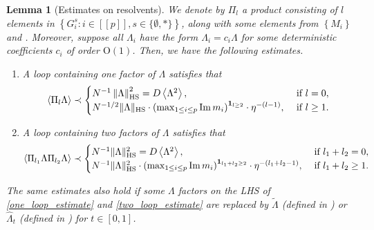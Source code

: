 \documentclass[10pt,reqno]{amsart}
\numberwithin{equation}{section}
\numberwithin{figure}{section}
\theoremstyle{plain} %
\newtheorem{lemma}[theorem]{Lemma}
\theoremstyle{definition} %
\newcommand{\wh}{\widehat}
\newcommand{\wt}{\widetilde}
\renewcommand{\txt}[1]{\text{\rm{#1}}}
\renewcommand{\leq}{\le}
\renewcommand{\geq}{\ge}
\newcommand{\qq}[1]{[\![{#1}]\!]}
\newcommand{\pa}[1]{\left({#1}\right)}
\newcommand{\qa}[1]{\left[{#1}\right]}
\newcommand{\ha}[1]{\left\{{#1}\right\}}
\newcommand{\norm}[1]{\lVert #1 \rVert}
\newcommand{\norma}[1]{\left\lVert #1 \right\rVert}
\newcommand{\avga}[1]{\left\langle #1 \right\rangle}
\DeclareMathOperator{\im}{\mathrm{Im}}
\newcommand{\tLambda}{{\wt{\Lambda}}}
\newcommand{\hLambda}{{\wh{\Lambda}}}
\newcommand{\OO}{\mathrm{O}}
\numberwithin{equation}{section}
\begin{document}
\begin{lemma}[Estimates on resolvents]
    We denote by $\Pi_l$ a product consisting of $l$ elements in $\ha{G_i^{s}:i\in \qq{p},s\in \{\emptyset,*\}}$, along with some elements from $\ha{M_i}$ and \smash{$\ha{E_a}_{a=1}^D$}. Moreover, suppose all $\Lambda_i$ have the form $\Lambda_i=c_i\Lambda$ for some deterministic coefficients $c_i$ of order $\OO(1)$. Then, we have the following estimates.
    \begin{enumerate}
        \item A loop containing one factor of $\Lambda$ satisfies that
    \begin{equation}\label{one_loop_estimate}
    \left\langle\Pi_l \Lambda\right\rangle \prec \begin{cases} N^{-1}\norma{\Lambda}_{\txt{HS}}^2=D\avga{\Lambda^2}, & \text { if } l=0, \\ N^{-1 / 2}\norm{\Lambda}_{\txt{HS}}\cdot \pa{\max_{1\leq i\leq p} \im m_i }^{\mathbf 1_{l\geq 2}}\cdot \eta^{-(l-1)}, & \text { if } l \geq 1.\end{cases}
    \end{equation}
    \item A loop containing two factors of $\Lambda$ satisfies that
    \begin{equation}\label{two_loop_estimate}
        \left\langle\Pi_{l_1} \Lambda \Pi_{l_2} \Lambda\right\rangle \prec \begin{cases}N^{-1}\norm{\Lambda}_{\txt{HS}}^2=D\avga{\Lambda^2}, & \text { if } l_1+l_2=0, \\ N^{-1}\norm{\Lambda}_{\txt{HS}}^2\cdot \pa{\max_{1\leq i\leq p} \im m_i}^{\mathbf 1_{l_1+l_2\geq 2}} \cdot \eta^{-(l_1+l_2-1)},  & \text { if } l_1+l_2 \geq 1.\end{cases}
    \end{equation}
    \end{enumerate}
    The same estimates also hold if some $\Lambda$ factors on the LHS of \eqref{one_loop_estimate} and \eqref{two_loop_estimate} are replaced by $\tLambda$ (defined in ) or $\hLambda_t$ (defined in ) for $t\in\qa{0,1}$.
\end{lemma}
\end{document}
